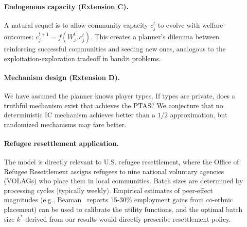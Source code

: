\documentclass[11pt]{article}
\begin{document}
\paragraph{Endogenous capacity (Extension C).}
A natural sequel is to allow community capacity $c_j^t$ to evolve with welfare
outcomes: $c_j^{t+1} = f(W_j^t, c_j^t)$.
This creates a planner's dilemma between reinforcing successful communities and
seeding new ones, analogous to the exploitation-exploration tradeoff in bandit
problems.

\paragraph{Mechanism design (Extension D).}
We have assumed the planner knows player types.
If types are private, does a truthful mechanism exist that achieves the PTAS?
We conjecture that no deterministic IC mechanism achieves better than a $1/2$
approximation, but randomized mechanisms may fare better.

\paragraph{Refugee resettlement application.}
The model is directly relevant to U.S. refugee resettlement, where the Office of
Refugee Resettlement assigns refugees to nine national voluntary agencies (VOLAGs)
who place them in local communities.
Batch sizes are determined by processing cycles (typically weekly).
Empirical estimates of peer-effect magnitudes (e.g., Beaman~\cite{beaman2012} reports
15-30\% employment gains from co-ethnic placement) can be used to calibrate the
utility functions, and the optimal batch size $k^*$ derived from our results would
directly prescribe resettlement policy.

\end{document}
